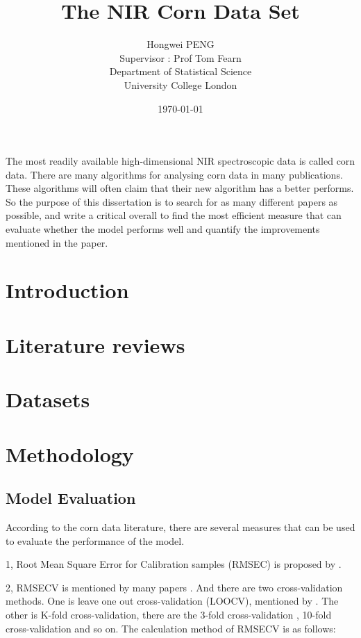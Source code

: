 \documentclass[a4paper,12pt,titlepage]{article} %
\title{The NIR Corn Data Set}
\author{Hongwei PENG \vspace{2cm} \\
	Supervisor : Prof Tom Fearn \vspace{2cm} \\
	Department of Statistical Science \\
	University College London}
\date{\today} %
\numberwithin{equation}{section}  %
\begin{document}
	\maketitle         %
	\tableofcontents   %
	\newpage           %
	
	The most readily available high-dimensional NIR spectroscopic data is called corn data. There are many algorithms for analysing corn data in many publications. These algorithms will often claim that their new algorithm has a better performs. So the purpose of this dissertation is to search for as many different papers as possible, and write a critical overall to find the most efficient measure that can evaluate whether the model performs well and quantify the improvements mentioned in the paper.
	
	\section{Introduction}             %
	\label{sec:intro}                  %
	
	\section{Literature reviews}
	\label{sec:liter}
	
	\section{Datasets}
	\label{sec:data}
	
	\section{Methodology}
	\label{sec:method}
	
	\subsection{Model Evaluation}
	\label{sec:eva}
	According to the corn data literature, there are several measures that can be used to evaluate the performance of the model.
	
	1, Root Mean Square Error for Calibration samples (RMSEC) is proposed by \citet{2yun2014strategy}.
	
	2, RMSECV is mentioned by many papers \citep{8ji2015using}. And there are two cross-validation methods. One is leave one out cross-validation (LOOCV), mentioned by \citet{6zheng2015pretreating}. The other is K-fold cross-validation, there are the 3-fold cross-validation \citep{3galvao2007cross}, 10-fold cross-validation \citep{8ji2015using} and so on. The calculation method of RMSECV is as follows:
	
\end{document}
